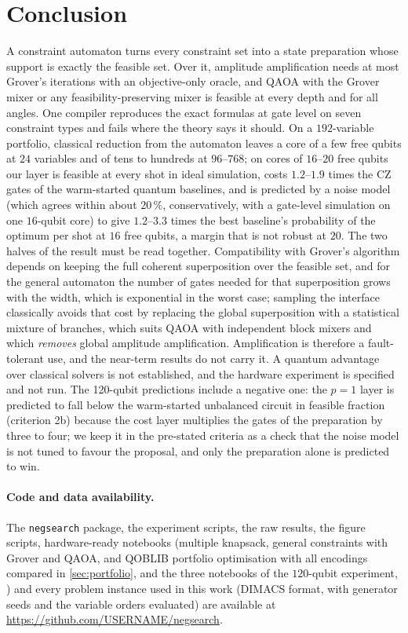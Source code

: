 \documentclass[10pt,twocolumn]{article}
\newcommand{\RepoURL}{\url{https://github.com/USERNAME/negsearch}} %
\begin{document}
\section{Conclusion}
A constraint automaton turns every constraint set into a state preparation whose support is exactly the feasible set. Over it, amplitude amplification needs at most Grover's iterations with an objective-only oracle, and QAOA with the Grover mixer or any feasibility-preserving mixer is feasible at every depth and for all angles. One compiler reproduces the exact formulas at gate level on seven constraint types and fails where the theory says it should. On a $192$-variable portfolio, classical reduction from the automaton leaves a core of a few free qubits at $24$ variables and of tens to hundreds at $96$--$768$; on cores of $16$--$20$ free qubits our layer is feasible at every shot in ideal simulation, costs $1.2$--$1.9$ times the CZ gates of the warm-started quantum baselines, and is predicted by a noise model (which agrees within about $20\,\%$, conservatively, with a gate-level simulation on one $16$-qubit core) to give $1.2$--$3.3$ times the best baseline's probability of the optimum per shot at $16$ free qubits, a margin that is not robust at $20$. The two halves of the result must be read together. Compatibility with Grover's algorithm depends on keeping the full coherent superposition over the feasible set, and for the general automaton the number of gates needed for that superposition grows with the width, which is exponential in the worst case; sampling the interface classically avoids that cost by replacing the global superposition with a statistical mixture of branches, which suits QAOA with independent block mixers and which \emph{removes} global amplitude amplification. Amplification is therefore a fault-tolerant use, and the near-term results do not carry it. A quantum advantage over classical solvers is not established, and the hardware experiment is specified and not run. The 120-qubit predictions include a negative one: the $p=1$ layer is predicted to fall below the warm-started unbalanced circuit in feasible fraction (criterion 2b) because the cost layer multiplies the gates of the preparation by three to four; we keep it in the pre-stated criteria as a check that the noise model is not tuned to favour the proposal, and only the preparation alone is predicted to win.

\paragraph{Code and data availability.} The \texttt{negsearch} package, the experiment scripts, the raw results, the figure scripts, hardware-ready notebooks (multiple knapsack, general constraints with Grover and QAOA, and QOBLIB portfolio optimisation with all encodings compared in \cref{sec:portfolio}, and the three notebooks of the $120$-qubit experiment, ) and every problem instance used in this work (DIMACS format, with generator seeds and the variable orders evaluated) are available at \RepoURL{}.
\end{document}
